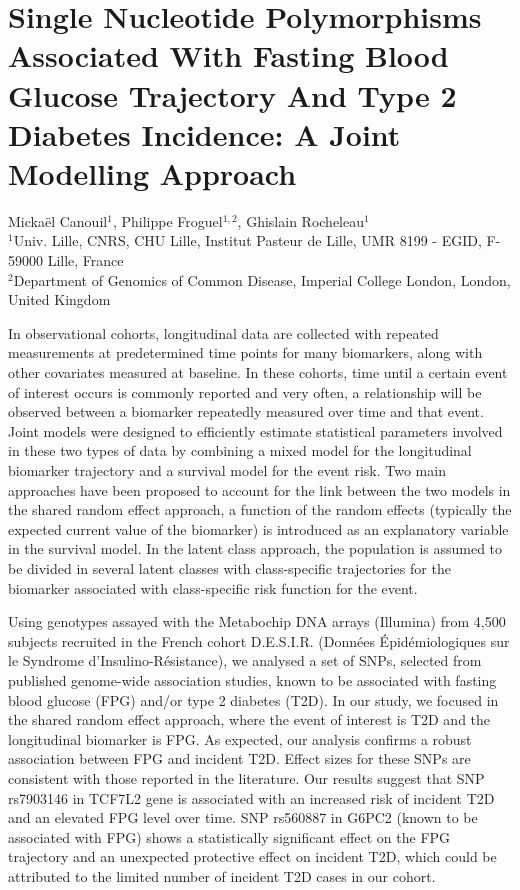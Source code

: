\documentclass[11pt, a4paper]{article}
\begin{document}
\section*{Single Nucleotide Polymorphisms Associated With Fasting Blood Glucose Trajectory And Type 2 Diabetes Incidence: \linebreak A Joint \mbox{Modelling} Approach}

\par{\small{{
    Mickaël Canouil$^{1}$, Philippe Froguel$^{1,2}$, Ghislain Rocheleau$^{1}$\\
    $^{1}$Univ. Lille, CNRS, CHU Lille, Institut Pasteur de Lille, UMR 8199 - EGID, F-59000 Lille, France\\
    $^{2}$Department of Genomics of Common Disease, Imperial College London, London, United Kingdom
}}}

\par{
In observational cohorts, longitudinal data are collected with repeated measurements at predetermined time points for many biomarkers, along with other covariates measured at baseline.
In these cohorts, time until a certain event of interest occurs is commonly reported and very often, a relationship will be observed between a biomarker repeatedly measured over time and that event.
Joint models were designed to efficiently estimate statistical parameters involved in these two types of data by combining a mixed model for the longitudinal biomarker trajectory and a survival model for the event risk.
Two main approaches have been proposed to account for the link between the two models in the shared random effect approach,
a function of the random effects (typically the expected current value of the biomarker) is introduced as an explanatory variable in the survival model.
In the latent class approach, the population is assumed to be divided in several latent classes with class-specific trajectories for the biomarker associated with class-specific risk function for the event.
}

\par{
Using genotypes assayed with the Metabochip DNA arrays (Illumina) from 4,500 subjects recruited in the French cohort D.E.S.I.R. (Données Épidémiologiques sur le Syndrome d’Insulino-Résistance),
we analysed a set of SNPs, selected from published genome-wide association studies, known to be associated with fasting blood glucose (FPG) and/or type 2 diabetes (T2D).
In our study, we focused in the shared random effect approach, where the event of interest is T2D and the longitudinal biomarker is FPG.
As expected, our analysis confirms a robust association between FPG and incident T2D. Effect sizes for these SNPs are consistent with those reported in the literature.
Our results suggest that SNP rs7903146 in TCF7L2 gene is associated with an increased risk of incident T2D and an elevated FPG level over time.
SNP rs560887 in G6PC2 (known to be associated with FPG) shows a statistically significant effect on the FPG trajectory and an unexpected protective effect on incident T2D,
which could be attributed to the limited number of incident T2D cases in our cohort.
}
\end{document}
